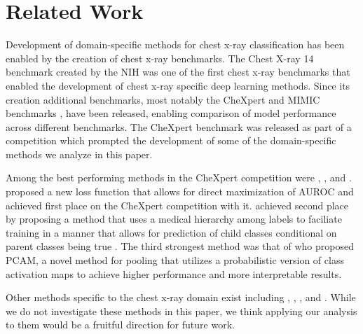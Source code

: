 \section{Related Work}
Development of domain-specific methods for chest x-ray classification has been enabled by the creation of chest x-ray benchmarks. The Chest X-ray 14 benchmark \citep{wang2017chestx} created by the NIH was one of the first chest x-ray benchmarks that enabled the development of chest x-ray specific deep learning methods. Since its creation additional benchmarks, most notably the CheXpert and MIMIC benchmarks \citep{irvin2019chexpert,johnson2019mimic}, have been released, enabling comparison of model performance across different benchmarks. The CheXpert benchmark was released as part of a competition which prompted the development of some of the domain-specific methods we analyze in this paper.

Among the best performing methods in the CheXpert competition were \citet{yuan2020large}, \citet{pham2021interpreting}, and \citet{ye2020weakly}. \citet{yuan2020large} proposed a new loss function that allows for direct maximization of AUROC and achieved first place on the CheXpert competition with it. \citet{pham2021interpreting} achieved second place by proposing a method that uses a medical hierarchy among labels to faciliate training in a manner that allows for prediction of child classes conditional on parent classes being true \citep{chen2019deep}. The third strongest method was that of \citet{ye2020weakly} who proposed PCAM, a novel method for pooling that utilizes a probabilistic version of class activation maps to achieve higher performance and more interpretable results. 

Other methods specific to the chest x-ray domain exist including \citet{kamal2022anatomy}, \citet{yan2018weakly}, \citet{chen2019lesion}, and \citet{guan2018diagnose}. While we do not investigate these methods in this paper, we think applying our analysis to them would be a fruitful direction for future work.
